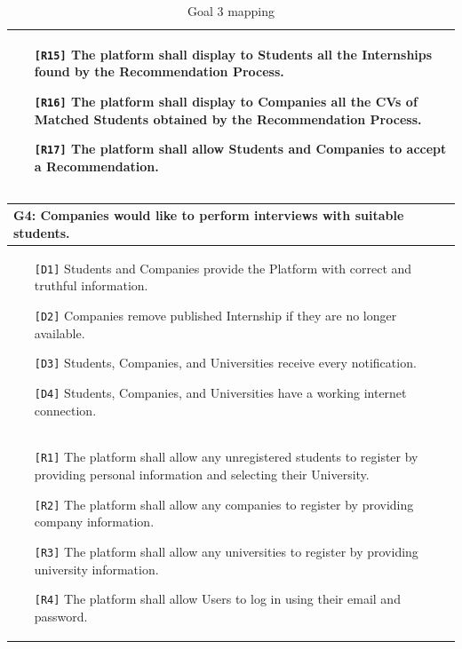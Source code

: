 \begin{table}[H]
\begin{tabular}{|p{15cm}|}
\begin{itemize}
            \item[\texttt{[R15]}] The platform shall display to Students all the Internships found by the Recommendation Process.
            \item[\texttt{[R16]}] The platform shall display to Companies all the CVs of Matched Students obtained by the Recommendation Process.
            \item[\texttt{[R17]}] The platform shall allow Students and Companies to accept a Recommendation.
        \end{itemize} \\ \hline
    \end{tabular}
    \caption{Goal 3 mapping}
    \label{tab:G3}
\end{table}

\begin{table}[H]
    \centering
    \begin{tabular}{|p{15cm}|}
         \hline
        \textbf{G4:} Companies would like to perform interviews with suitable students. \\ \hline
        \begin{itemize}
            \item[\texttt{[D1]}] Students and Companies provide the Platform with correct and truthful information.
            \item[\texttt{[D2]}] Companies remove published Internship if they are no longer available.
            \item[\texttt{[D3]}] Students, Companies, and Universities receive every notification.
            \item[\texttt{[D4]}] Students, Companies, and Universities have a working internet connection.
        \end{itemize} \\ \hline
        \begin{itemize}
            \item[\texttt{[R1]}] The platform shall allow any unregistered students to register by providing personal information and selecting their University.
            \item[\texttt{[R2]}] The platform shall allow any companies to register by providing company information. 
            \item[\texttt{[R3]}] The platform shall allow any universities to register by providing university information.
            \item[\texttt{[R4]}] The platform shall allow Users to log in using their email and password.

\end{itemize}
\end{tabular}
\end{table}
